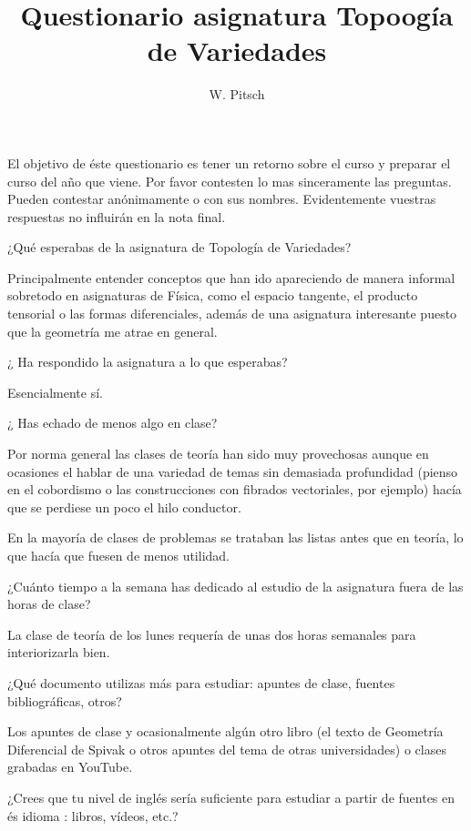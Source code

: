 \documentclass[]{exam}
\title{Questionario asignatura Topoogía de Variedades}
\author{W. Pitsch}
\date{}
\begin{document}
\maketitle

%

El objetivo de éste questionario es tener un retorno sobre el curso y preparar el curso del año que viene. Por favor contesten lo mas sinceramente las preguntas. Pueden contestar anónimamente o con sus nombres. Evidentemente vuestras respuestas no influirán en la nota final.

\begin{questions}

\question ¿Qué esperabas de la asignatura de Topología de Variedades?

Principalmente entender conceptos que han ido apareciendo de manera informal sobretodo en
asignaturas de Física, como el espacio tangente, el producto tensorial o las formas
diferenciales, además de una asignatura interesante puesto que la geometría me
atrae en general. 

\question ¿ Ha respondido la asignatura a lo que esperabas?

Esencialmente sí. 

\question¿ Has echado de menos algo en clase?

Por norma general las clases de teoría han sido muy provechosas aunque en ocasiones el
hablar de una variedad de temas sin demasiada profundidad (pienso en el cobordismo o las
construcciones con fibrados vectoriales, por ejemplo) hacía que se perdiese un poco el
hilo conductor.

En la mayoría de clases de problemas se trataban las listas antes que en teoría, lo que
hacía que fuesen de menos utilidad.

\question ¿Cuánto tiempo a la semana has dedicado al estudio de la asignatura fuera de las horas de clase? 

La clase de teoría de los lunes requería de unas dos horas semanales para interiorizarla
bien.


\question ¿Qué documento utilizas más para estudiar: apuntes de clase, fuentes bibliográficas, otros?

Los apuntes de clase y ocasionalmente algún otro libro (el texto de Geometría Diferencial
de Spivak o otros apuntes del tema de otras universidades) o clases grabadas en YouTube. 

\question ¿Crees que tu nivel de inglés sería suficiente para estudiar a partir de fuentes en és idioma : libros, vídeos, etc.?


\end{questions}
\end{document}
